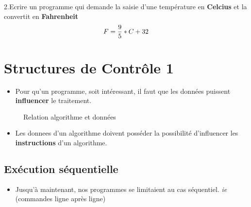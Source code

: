 \documentclass[letterpaper,10pt,english]{sphinxmanual}
\begin{document}
2.Ecrire un programme qui demande la saisie d'une température en \textbf{Celcius} et la convertit en \textbf{Fahrenheit}
\begin{gather}
\begin{split}F= \dfrac{9}{5}*C + 32\end{split}\notag
\end{gather}

\section{Structures de Contrôle 1}
\label{structures1:structures1}\label{structures1::doc}\label{structures1:structures-de-controle-1}\begin{itemize}
\item {} 
Pour qu'un programme, soit intéressant, il faut que les données puissent \textbf{influencer} le traitement.

\end{itemize}
\begin{figure}[htbp]
\centering
\capstart

\caption{Relation algorithme et données}\end{figure}
\begin{itemize}
\item {} 
Les donnees d'un algorithme doivent posséder la possibilité d'influencer les \textbf{instructions} d'un algorithme.

\end{itemize}


\subsection{Exécution séquentielle}
\label{structures1:execution-sequentielle}\begin{itemize}
\item {} 
Jusqu'à maintenant, nos programmes se limitaient au cas séquentiel. \emph{ie} (commandes ligne après ligne)

\end{itemize}
\end{document}
